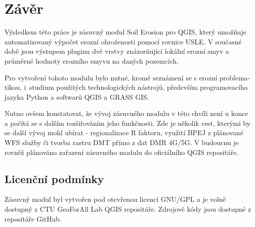 \chapter{Závěr}


Výsledkem této práce je zásuvný modul Soil Erosion pro QGIS, který
umožňuje automatizovaný výpočet erozní ohroženosti pomocí rovnice
USLE. V současné době jsou výstupem pluginu dvě vrstvy znázorňující
lokální erozní smyv a průměrné hodnoty erozního smyvu na daných
pozemcích.

Pro vytvoření tohoto modulu bylo nutné, kromě seznámení se s erozní
problema-tikou, i~studium použitých technologických nástrojů, především
programovacího jazyka Python a softwarů QGIS a GRASS GIS.

Nutno ovšem konstatovat, že vývoj zásuvného modulu v této chvíli není
u konce a počítá se s dalším rozšiřováním jeho funkčnosti. Zde je
několik cest, kterými by se další vývoj mohl ubírat - regionalizace R
faktoru, využití BPEJ z plánované WFS služby či tvorba rastru DMT
přímo z dat DMR 4G/5G. V budoucnu je rovněž plánováno zařazení
zásuvného modulu do oficiálního QGIS repositáře.

\section{Licenční podmínky}

Zásuvný modul byl vytvořen pod otevřenou licencí GNU/GPL a je volně
dostupný z CTU GeoForAll Lab QGIS repositáře. Zdrojové kódy jsou dostupné
z repositáře GitHub\cite{mujgithub}.

